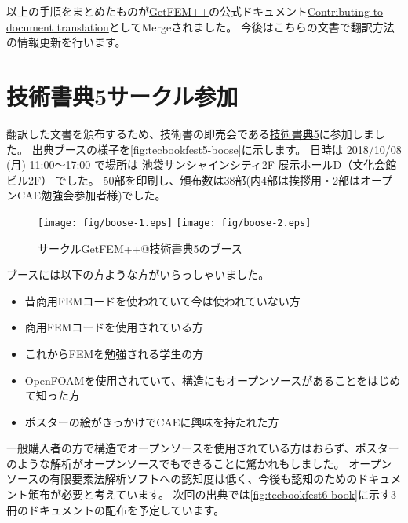 \documentclass{../../style/ltjoc}
\begin{document}
以上の手順をまとめたものが\href{http://getfem.org}{GetFEM++}の公式ドキュメント\href{http://getfem.org/project/contribute.html}{Contributing to document translation}としてMergeされました。
今後はこちらの文書で翻訳方法の情報更新を行います。

\section{技術書典5サークル参加}
翻訳した文書を頒布するため、技術書の即売会である\href{https://techbookfest.org/event/tbf05}{技術書典5}に参加しました。
出典ブースの様子を\autoref{fig:tecbookfest5-boose}に示します。
日時は 2018/10/08 (月) 11:00〜17:00 で場所は 池袋サンシャインシティ2F 展示ホールD（文化会館ビル2F） でした。
50部を印刷し、頒布数は38部(内4部は挨拶用・2部はオープンCAE勉強会参加者様)でした。
%
\begin{figure}[htbp]
\centering
\texttt{[image: fig/boose-1.eps]}
\texttt{[image: fig/boose-2.eps]}
\caption{\href{https://techbookfest.org/event/tbf05}{サークルGetFEM++@技術書典5のブース}}
\label{fig:tecbookfest5-boose}
\end{figure}
ブースには以下の方ような方がいらっしゃいました。
\begin{itemize}
  \item{昔商用FEMコードを使われていて今は使われていない方}
  \item{商用FEMコードを使用されている方}
  \item{これからFEMを勉強される学生の方}
  \item{OpenFOAMを使用されていて、構造にもオープンソースがあることをはじめて知った方}
  \item{ポスターの絵がきっかけでCAEに興味を持たれた方}
\end{itemize}
一般購入者の方で構造でオープンソースを使用されている方はおらず、ポスターのような解析がオープンソースでもできることに驚かれもしました。
オープンソースの有限要素法解析ソフトへの認知度は低く、今後も認知のためのドキュメント頒布が必要と考えています。
次回の出典では\autoref{fig:tecbookfest6-book}に示す3冊のドキュメントの配布を予定しています。
%
\end{document}
